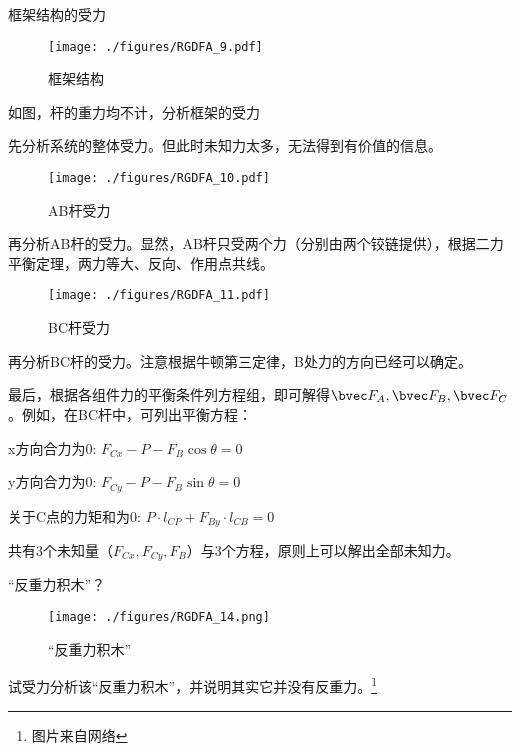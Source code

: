 \begin{example}{框架结构的受力}
\begin{figure}[ht]
\centering
\texttt{[image: ./figures/RGDFA\_9.pdf]}
\caption{框架结构} \label{RGDFA_fig9}
\end{figure}
如图，杆的重力均不计，分析框架的受力

先分析系统的整体受力。但此时未知力太多，无法得到有价值的信息。

\begin{figure}[ht]
\centering
\texttt{[image: ./figures/RGDFA\_10.pdf]}
\caption{AB杆受力} \label{RGDFA_fig10}
\end{figure}

再分析AB杆的受力。显然，AB杆只受两个力（分别由两个铰链提供），根据二力平衡定理，两力等大、反向、作用点共线。

\begin{figure}[ht]
\centering
\texttt{[image: ./figures/RGDFA\_11.pdf]}
\caption{BC杆受力} \label{RGDFA_fig11}
\end{figure}
再分析BC杆的受力。注意根据牛顿第三定律，B处力的方向已经可以确定。

最后，根据各组件力的平衡条件列方程组，即可解得$\bvec F_A, \bvec F_B, \bvec F_C$。例如，在BC杆中，可列出平衡方程：

x方向合力为0: $F_{Cx}-P-F_{B} \cos \theta=0$

y方向合力为0: $F_{Cy}-P-F_{B}\sin \theta=0$

关于C点的力矩和为0: $P \cdot l_{CP} + F_{By} \cdot l_{CB} = 0$

共有3个未知量（$F_{Cx}, F_{Cy}, F_B$）与3个方程，原则上可以解出全部未知力。
\end{example}
\begin{exercise}{“反重力积木”？}
\begin{figure}[ht]
\centering
\texttt{[image: ./figures/RGDFA\_14.png]}
\caption{“反重力积木”} \label{RGDFA_fig14}
\end{figure}
试受力分析该“反重力积木”，并说明其实它并没有反重力。\footnote{图片来自网络}
\end{exercise}
